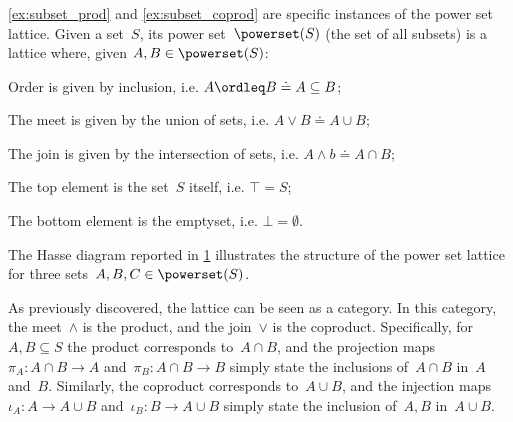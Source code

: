 \subsubsection{}
\cref{ex:subset_prod} and \cref{ex:subset_coprod} are specific instances of the power set lattice. Given a set~$S$, its power set~$\powerset(S)$ (the set of all subsets) is a lattice where, given $A,B\in \powerset(S)$:
\begin{compactitem}
\item Order is given by inclusion, i.e. $A\ordleq B \doteq A\subseteq B$;
\item The meet is given by the union of sets, i.e. $A\vee B \doteq A\cup B$;
\item The join is given by the intersection of sets, i.e. $A\wedge b \doteq A\cap B$;
\item The top element is the set~$S$ itself, i.e. $\top = S$;
\item The bottom element is the emptyset, i.e. $\bot = \emptyset$.
\end{compactitem}
The Hasse diagram reported in \cref{fig:prod_coprod_power} illustrates the structure of the power set lattice for three sets~$A,B,C\in \powerset(S)$.

\begin{figure}[h]
\begin{center}
\end{center}
\caption{\label{fig:prod_coprod_power}}
\end{figure}
As previously discovered, the lattice can be seen as a category. In this category, the meet~$\wedge$ is the product, and the join~$\vee$ is the coproduct. Specifically, for~$A,B\subseteq S$ the product corresponds to~$A\cap B$, and the projection maps~$\pi_A\colon A\cap B\to A$ and~$\pi_B\colon A\cap B\to B$ simply state the inclusions of~$A\cap B$ in~$A$ and~$B$. Similarly, the coproduct corresponds to~$A\cup B$, and the injection maps~$\iota_A\colon A\to A\cup B$ and~$\iota_B\colon B\to A\cup B$ simply state the inclusion of~$A,B$ in~$A\cup B$.




\subsubsection{}

